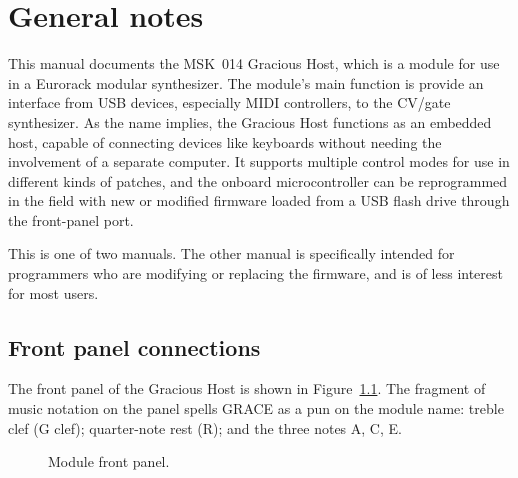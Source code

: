 
%
%
%
%
%
%

\chapter{General notes}

This manual documents the MSK~014 Gracious Host, which is a module for use
in a Eurorack modular synthesizer.  The module's main function is provide an
interface from USB devices, especially MIDI controllers, to the CV/gate
synthesizer.  As the name implies, the Gracious Host functions as an
embedded host, capable of connecting devices like keyboards without
needing the involvement of a separate computer.  It supports multiple
control modes for use in different kinds of patches, and the onboard
microcontroller can be reprogrammed in the field with new or modified
firmware loaded from a USB flash drive through the front-panel port.

This is one of two manuals.  The other manual is specifically intended for
programmers who are modifying or replacing the firmware, and is of less
interest for most users.

\section{Front panel connections}

The front panel of the Gracious Host is shown in
Figure~\ref{fig:panel-mockup}.  The fragment of music notation on the panel
spells GRACE as a pun on the module name:  treble clef (G clef); quarter-note
rest (R); and the three notes A, C, E.

\begin{figure}
{\centering\setlength{\fboxsep}{0pt}\setlength{\fboxrule}{0.6pt}%
 \par}
\caption{Module front panel.}\label{fig:panel-mockup}
\end{figure}

